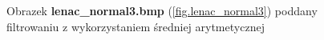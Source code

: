 \documentclass{classrep}
\begin{document}
\begin{figure}
{{  \label{fig.lenac_normal3_average_5x5}
 }
}
\caption{Obrazek \textbf{lenac\_normal3.bmp} (\ref{fig.lenac_normal3}) poddany filtrowaniu z wykorzystaniem średniej arytmetycznej}
\label{fig.lenac_normal3_average}
\end{figure}
\end{document}
